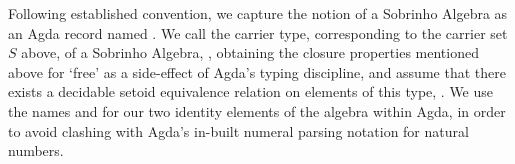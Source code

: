 Following established convention, we capture the notion of a Sobrinho Algebra as an Agda record named .
We call the carrier type, corresponding to the carrier set $S$ above, of a Sobrinho Algebra, , obtaining the closure properties mentioned above for `free' as a side-effect of Agda's typing discipline, and assume that there exists a decidable setoid equivalence relation on elements of this type, .
We use the names  and  for our two identity elements of the algebra within Agda, in order to avoid clashing with Agda's in-built numeral parsing notation for natural numbers.
